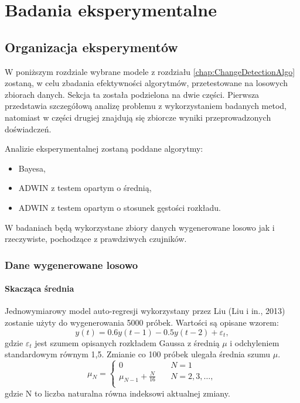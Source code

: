 \chapter{Badania eksperymentalne}
\section{Organizacja eksperymentów}
W poniższym rozdziale wybrane modele z rozdziału \ref{chap:ChangeDetectionAlgo} zostaną,
w celu zbadania efektywności algorytmów,
przetestowane na losowych zbiorach danych.
Sekcja ta została podzielona na dwie części.
Pierwsza przedstawia szczegółową analizę problemu z wykorzystaniem badanych metod,
natomiast w części drugiej znajdują się zbiorcze wyniki przeprowadzonych doświadczeń.

Analizie eksperymentalnej zostaną poddane algorytmy:
\begin{itemize}
  \item Bayesa,
  \item ADWIN z testem opartym o średnią,
  \item ADWIN z testem opartym o stosunek gęstości rozkładu.
\end{itemize}

W badaniach będą wykorzystane zbiory danych wygenerowane losowo jak i rzeczywiste,
pochodzące z prawdziwych czujników.
\subsection*{Dane wygenerowane losowo}
\subsubsection*{Skacząca średnia}
Jednowymiarowy model auto-regresji wykorzystany przez Liu (Liu i in., 2013)
zostanie użyty do wygenerowania 5000 próbek.
Wartości są opisane wzorem:
$$y(t) = 0.6y(t-1) - 0.5y(t-2) + \varepsilon_t,$$
gdzie $\varepsilon_t$ jest szumem opisanych rozkładem Gaussa z średnią $\mu$
i odchyleniem standardowym równym 1,5.
Zmianie co 100 próbek ulegała średnia szumu $\mu$.
\[ \mu_N =
  \begin{cases}
    0       & \quad N = 1\\
    \mu_{N-1} + \frac{N}{16} & \quad N = 2,3, \ldots, \\
  \end{cases}
\]
gdzie N to liczba naturalna równa indeksowi aktualnej zmiany.
